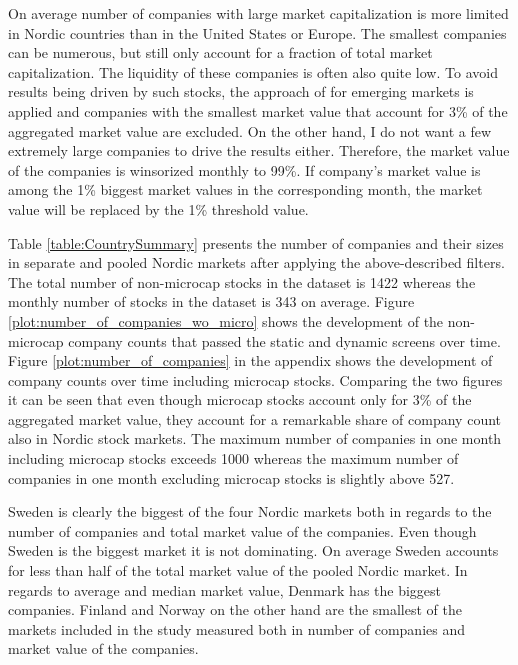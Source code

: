\documentclass[12pt]{article}
\begin{document}
On average number of companies with large market capitalization is more limited in Nordic countries than in the United States or Europe. The smallest companies can be numerous, but still only account for a fraction of total market capitalization. The liquidity of these companies is often also quite low. To avoid results being driven by such stocks, the approach of \citet{HANAUER2023} for emerging markets is applied and companies with the smallest market value that account for 3\% of the aggregated market value are excluded. On the other hand, I do not want a few extremely large companies to drive the results either. Therefore, the market value of the companies is winsorized monthly to 99\%. If company's market value is among the 1\% biggest market values in the corresponding month, the market value will be replaced by the 1\% threshold value.\footnotemark {} \par

Table \ref{table:CountrySummary} presents the number of companies and their sizes in separate and pooled Nordic markets after applying the above-described filters. The total number of non-microcap stocks in the dataset is 1422 whereas the monthly number of stocks in the dataset is 343 on average. Figure \ref{plot:number_of_companies_wo_micro} shows the development of the non-microcap company counts that passed the static and dynamic screens over time. Figure \ref{plot:number_of_companies} in the appendix shows the development of company counts over time including microcap stocks. Comparing the two figures it can be seen that even though microcap stocks account only for 3\% of the aggregated market value, they account for a remarkable share of company count also in Nordic stock markets. The maximum number of companies in one month including microcap stocks exceeds 1000 whereas the maximum number of companies in one month excluding microcap stocks is slightly above 527. \par

Sweden is clearly the biggest of the four Nordic markets both in regards to the number of companies and total market value of the companies. Even though Sweden is the biggest market it is not dominating. On average Sweden accounts for less than half of the total market value of the pooled Nordic market. In regards to average and median market value, Denmark has the biggest companies. Finland and Norway on the other hand are the smallest of the markets included in the study measured both in number of companies and market value of the companies. \par
\end{document}
